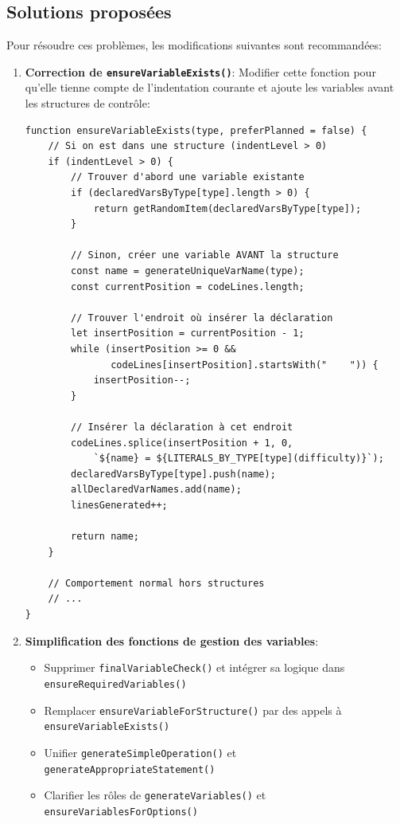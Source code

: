 \documentclass[11pt,a4paper]{article}
\begin{document}
\subsection{Solutions proposées}

Pour résoudre ces problèmes, les modifications suivantes sont recommandées:

\begin{enumerate}
    \item \textbf{Correction de \texttt{ensureVariableExists()}}: Modifier cette fonction pour qu'elle tienne compte de l'indentation courante et ajoute les variables avant les structures de contrôle:
    
    \begin{verbatim}
function ensureVariableExists(type, preferPlanned = false) {
    // Si on est dans une structure (indentLevel > 0)
    if (indentLevel > 0) {
        // Trouver d'abord une variable existante
        if (declaredVarsByType[type].length > 0) {
            return getRandomItem(declaredVarsByType[type]);
        }
        
        // Sinon, créer une variable AVANT la structure
        const name = generateUniqueVarName(type);
        const currentPosition = codeLines.length;
        
        // Trouver l'endroit où insérer la déclaration
        let insertPosition = currentPosition - 1;
        while (insertPosition >= 0 && 
               codeLines[insertPosition].startsWith("    ")) {
            insertPosition--;
        }
        
        // Insérer la déclaration à cet endroit
        codeLines.splice(insertPosition + 1, 0, 
            `${name} = ${LITERALS_BY_TYPE[type](difficulty)}`);
        declaredVarsByType[type].push(name);
        allDeclaredVarNames.add(name);
        linesGenerated++;
        
        return name;
    }
    
    // Comportement normal hors structures
    // ...
}
    \end{verbatim}
    
    \item \textbf{Simplification des fonctions de gestion des variables}:
    \begin{itemize}
        \item Supprimer \texttt{finalVariableCheck()} et intégrer sa logique dans \texttt{ensureRequiredVariables()}
        \item Remplacer \texttt{ensureVariableForStructure()} par des appels à \texttt{ensureVariableExists()}
        \item Unifier \texttt{generateSimpleOperation()} et \texttt{generateAppropriateStatement()}
        \item Clarifier les rôles de \texttt{generateVariables()} et \texttt{ensureVariablesForOptions()}
    \end{itemize}
    

\end{enumerate}
\end{document}
